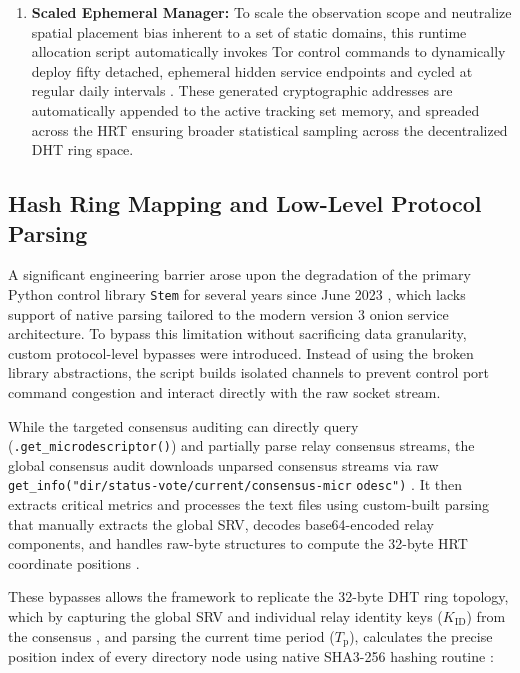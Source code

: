 \documentclass[conference]{IEEEtran}
\begin{document}
\begin{enumerate}
    \item \textbf{Scaled Ephemeral Manager:} To scale the observation scope and neutralize spatial placement bias inherent to a set of static domains, this runtime allocation script automatically invokes Tor control commands to dynamically deploy fifty detached, ephemeral hidden service endpoints and cycled at regular daily intervals \cite{tor_controlspec}. These generated cryptographic addresses are automatically appended to the active tracking set memory, and spreaded across the HRT ensuring broader statistical sampling across the decentralized DHT ring space.
\end{enumerate}

\subsection{Hash Ring Mapping and Low-Level Protocol Parsing}

A significant engineering barrier arose upon the degradation of the primary Python control library \texttt{Stem} for several years since June 2023 \cite{stem_github}, which lacks support of native parsing tailored to the modern version 3 onion service architecture. To bypass this limitation without sacrificing data granularity, 
custom protocol-level bypasses were introduced. Instead of using the broken library abstractions, the script builds isolated channels to prevent control port command congestion and interact directly with the raw socket stream. 

While the targeted consensus auditing can directly query (\texttt{.get\_microdescriptor()}) and partially parse relay consensus streams, the global consensus audit downloads unparsed consensus streams via raw \texttt{get\_info("dir/status-vote/current/consensus-micr} \texttt{odesc")} \cite{tor_controlspec}. It then extracts critical
metrics and processes the text files using custom-built parsing that manually extracts the global SRV, decodes base64-encoded relay components, and handles raw-byte structures to compute the 32-byte HRT coordinate positions \cite{tor_dirspec}.

These bypasses allows the framework to replicate the 32-byte DHT ring topology, which by capturing the global SRV and individual relay identity keys ($\textit{K}_{\text{ID}}$) from the consensus
, and parsing the current time period ($\textit{T}_{\text{p}}$), calculates the precise position index of every directory node using native SHA3-256 hashing routine \cite{tor_rendspec}:
\end{document}
